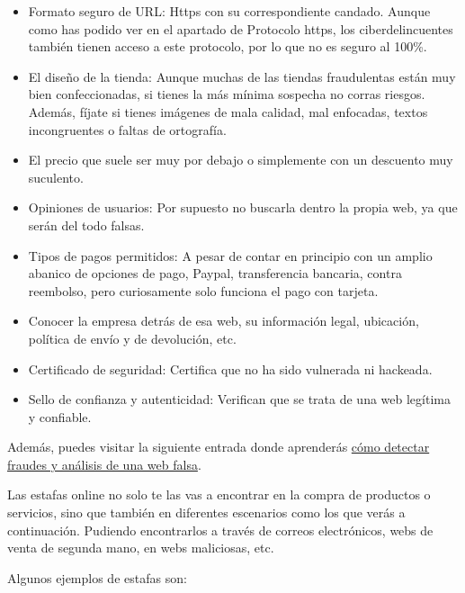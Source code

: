 \documentclass[
  a4paper,
  openany]{book}
\begin{document}
\begin{itemize}
\item
  Formato seguro de URL: Https con su correspondiente candado. Aunque como has podido ver en el apartado de Protocolo https, los ciberdelincuentes también tienen acceso a este protocolo, por lo que no es seguro al 100\%.
\item
  El diseño de la tienda: Aunque muchas de las tiendas fraudulentas están muy bien confeccionadas, si tienes la más mínima sospecha no corras riesgos. Además, fíjate si tienes imágenes de mala calidad, mal enfocadas, textos incongruentes o faltas de ortografía.
\item
  El precio que suele ser muy por debajo o simplemente con un descuento muy suculento.
\item
  Opiniones de usuarios: Por supuesto no buscarla dentro la propia web, ya que serán del todo falsas.
\item
  Tipos de pagos permitidos: A pesar de contar en principio con un amplio abanico de opciones de pago, Paypal, transferencia bancaria, contra reembolso, pero curiosamente solo funciona el pago con tarjeta.
\item
  Conocer la empresa detrás de esa web, su información legal, ubicación, política de envío y de devolución, etc.
\item
  Certificado de seguridad: Certifica que no ha sido vulnerada ni hackeada.
\item
  Sello de confianza y autenticidad: Verifican que se trata de una web legítima y confiable.
\end{itemize}

Además, puedes visitar la siguiente entrada donde aprenderás \href{https://www.osi.es/es/actualidad/blog/2018/08/08/detectando-fraudes-analisis-de-una-web-de-venta-falsa}{cómo detectar fraudes y análisis de una web falsa}.

Las estafas online no solo te las vas a encontrar en la compra de productos o servicios, sino que también en diferentes escenarios como los que verás a continuación. Pudiendo encontrarlos a través de correos electrónicos, webs de venta de segunda mano, en webs maliciosas, etc.

Algunos ejemplos de estafas son:
\end{document}
